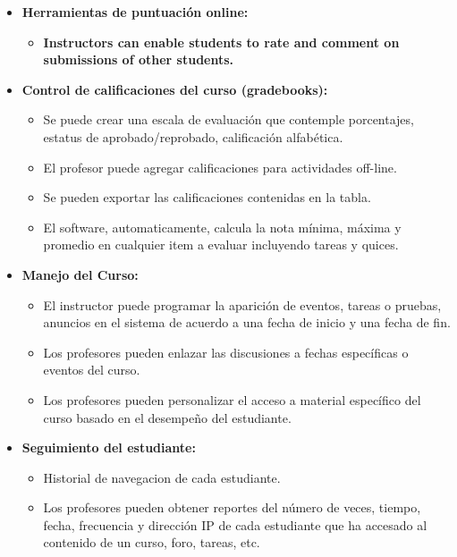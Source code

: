 	\begin{itemize}
		\item \textbf{Herramientas de puntuación online:}
			\begin{itemize}
				\item \textbf{Instructors can enable students to rate and comment on submissions of other students.}
			\end{itemize}
	\end{itemize}
	\begin{itemize}
		\item \textbf{Control de calificaciones del curso (gradebooks):}
			\begin{itemize}
				\item Se puede crear una escala de evaluación que contemple porcentajes, estatus de aprobado/reprobado, calificación alfabética.
				\item El profesor puede agregar calificaciones para actividades off-line.
				\item Se pueden exportar las calificaciones contenidas en la tabla.
				\item El software, automaticamente, calcula la nota mínima, máxima y promedio en cualquier item a evaluar incluyendo tareas y quices.
			\end{itemize}
	\end{itemize}
	\begin{itemize}
		\item \textbf{Manejo del Curso:}
			\begin{itemize}
				\item El instructor puede programar la aparición de eventos, tareas o pruebas, anuncios en el sistema de acuerdo a una fecha de inicio y una fecha de fin.
				\item Los profesores pueden enlazar las discusiones a fechas específicas o eventos del curso.
				\item Los profesores pueden personalizar el acceso a material específico del curso basado en el desempeño del estudiante.
			\end{itemize}
	\end{itemize}
	\begin{itemize}
		\item \textbf{Seguimiento del estudiante:}
			\begin{itemize}
				\item Historial de navegacion de cada estudiante.
				\item Los profesores pueden obtener reportes del número de veces, tiempo, fecha, frecuencia y dirección IP de cada estudiante que ha accesado al contenido de un curso, foro, tareas, etc.
			\end{itemize}
	\end{itemize}
